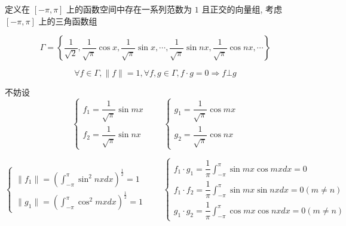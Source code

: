 \begin{definition}
	定义在 $[-\pi,\pi]$ 上的函数空间中存在一系列范数为 $1$ 且正交的向量组, 考虑 $[-\pi,\pi]$ 上的三角函数组
	
	$$\Gamma = \left\{\dfrac{1}{\sqrt{2}}, \dfrac{1}{\sqrt{\pi}}\cos x, \dfrac{1}{\sqrt{\pi}}\sin x, \cdots, \dfrac{1}{\sqrt{\pi}}\sin nx, \dfrac{1}{\sqrt{\pi}}\cos nx, \cdots\right\}$$
	
	$$\forall f \in \Gamma, \parallel f \parallel = 1, \forall f,g \in \Gamma, f \cdot g = 0\Rightarrow f \bot g$$

	不妨设 $$\begin{cases}
		f_{1} = \dfrac{1}{\sqrt{\pi}}\sin mx\\
		f_{2} = \dfrac{1}{\sqrt{\pi}}\sin nx
	\end{cases}\qquad 
	\begin{cases}
	  g_{1} = \dfrac{1}{\sqrt{\pi}} \cos mx\\
	  g_{2} = \dfrac{1}{\sqrt{\pi}} \cos nx
	\end{cases}$$

	$$ \begin{cases}
		\parallel f_{1} \parallel = \left(\displaystyle{\int_{-\pi}^{\pi}\sin^{2} nxdx}\right)^{\frac{1}{2}} = 1\\
		\parallel g_{1} \parallel = \left(\displaystyle{\int_{-\pi}^{\pi}\cos^{2} mxdx}\right)^{\frac{1}{2}} = 1
	\end{cases} \qquad
	 \begin{cases}
		f_{1} \cdot g_{1} = \dfrac{1}{\pi}\displaystyle{\int_{-\pi}^{\pi}\sin mx\cos mxdx} = 0 \\
		f_{1} \cdot f_{2} = \dfrac{1}{\pi}\displaystyle{\int_{-\pi}^{\pi}\sin mx\sin nxdx} = 0 (m\neq n)\\
		g_{1} \cdot g_{2} = \dfrac{1}{\pi}\displaystyle{\int_{-\pi}^{\pi}\cos mx\cos nxdx} = 0 (m\neq n)
	 \end{cases}$$
\end{definition}

